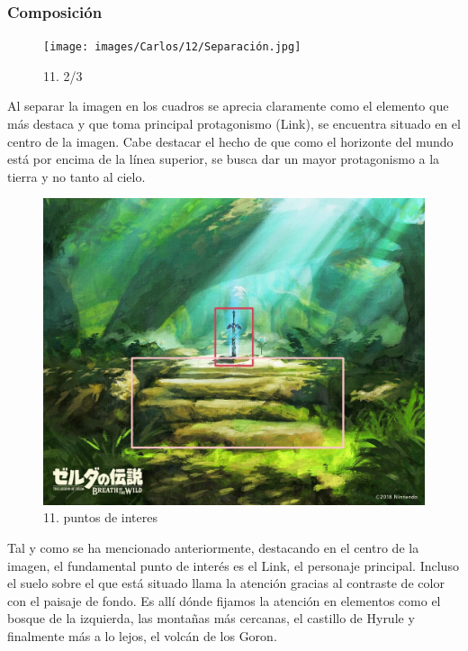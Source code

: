 \documentclass[12pt]{article}
\begin{document}
            \subsubsection{Composición}
            \begin{figure}[H]
      \centering
      \texttt{[image: images/Carlos/12/Separación.jpg]}
      \caption{\small 11. 2/3}
    \end{figure}
    Al separar la imagen en los cuadros se aprecia claramente como el elemento que más destaca y que toma principal protagonismo (Link), se encuentra situado en el centro de la imagen. Cabe destacar el hecho de que como el horizonte del mundo está por encima de la línea superior, se busca dar un mayor protagonismo a la tierra y no tanto al cielo.

    \begin{figure}[H]
      \centering
      \includegraphics[scale=0.35]{images/Carlos/12/CuadrosRositas.jpg}
      \caption{\small 11. puntos de interes}
    \end{figure}
    Tal y como se ha mencionado anteriormente, destacando en el centro de la imagen, el fundamental punto de interés es el Link, el personaje principal. Incluso el suelo sobre el que está situado llama la atención gracias al contraste de color con el paisaje de fondo. Es allí dónde fijamos la atención en elementos como el bosque de la izquierda, las montañas más cercanas, el castillo de Hyrule y finalmente más a lo lejos, el volcán de los Goron.
\end{document}
